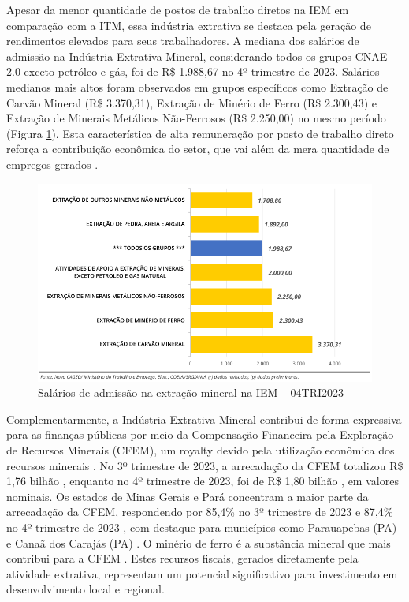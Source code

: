 Apesar da menor quantidade de postos de trabalho diretos na IEM em comparação com a ITM, essa indústria extrativa se destaca pela geração de rendimentos elevados para seus trabalhadores. A mediana dos salários de admissão na Indústria Extrativa Mineral, considerando todos os grupos CNAE 2.0 exceto petróleo e gás, foi de R\$ 1.988,67 no 4º trimestre de 2023. Salários medianos mais altos foram observados em grupos específicos como Extração de Carvão Mineral (R\$ 3.370,31), Extração de Minério de Ferro (R\$ 2.300,43) e Extração de Minerais Metálicos Não-Ferrosos (R\$ 2.250,00) no mesmo período (Figura \ref{fig:salarios_admissao}). Esta característica de alta remuneração por posto de trabalho direto reforça a contribuição econômica do setor, que vai além da mera quantidade de empregos gerados \cite{anm2023d}.

\begin{figure}[!htb]
    \centering
    \includegraphics[width=\textwidth]{figures/image11_salarios_admissao.png}
    \caption{Salários de admissão na extração mineral na IEM -- 04TRI2023}
    \label{fig:salarios_admissao}
\end{figure}

Complementarmente, a Indústria Extrativa Mineral contribui de forma expressiva para as finanças públicas por meio da Compensação Financeira pela Exploração de Recursos Minerais (CFEM), um royalty devido pela utilização econômica dos recursos minerais \cite{anm2023a}. No 3º trimestre de 2023, a arrecadação da CFEM totalizou R\$ 1,76 bilhão \cite{anm2023c}, enquanto no 4º trimestre de 2023, foi de R\$ 1,80 bilhão \cite{anm2023d}, em valores nominais. Os estados de Minas Gerais e Pará concentram a maior parte da arrecadação da CFEM, respondendo por 85,4\% no 3º trimestre de 2023 \cite{anm2023c} e 87,4\% no 4º trimestre de 2023 \cite{anm2023d}, com destaque para municípios como Parauapebas (PA) e Canaã dos Carajás (PA) \cite{anm2023c,anm2023d}. O minério de ferro é a substância mineral que mais contribui para a CFEM \cite{anm2023c,anm2023a}. Estes recursos fiscais, gerados diretamente pela atividade extrativa, representam um potencial significativo para investimento em desenvolvimento local e regional.

